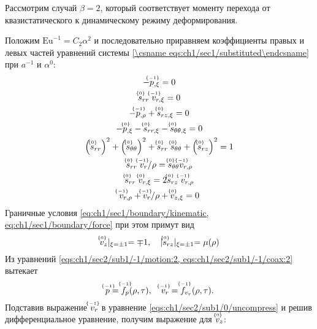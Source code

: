 Рассмотрим случай $\beta=2$, который соответствует моменту перехода от квазистатического к динамическому режиму деформирования.

Положим $\text{Eu}^{-1} = C_2 \alpha^2$ и последовательно приравняем коэффициенты правых и левых частей уравнений системы \cref{\csname eqs:ch1/sec1/substituted\endcsname} при $a^{-1}$ и $\alpha^0$:
\begingroup
\allowdisplaybreaks
\begin{gather}
  \label{eqs:ch1/sec2/sub1/-1/motion:2}
  -\uindex{p}{-1}_{,\xi} = 0
  \\
  \label{eqs:ch1/sec2/sub1/-1/coax:2}
  \uindex{s}{0}_{rr} \; \uindex{v}{-1}_{r,\xi} = 0
  \\
  \label{eqs:ch1/sec2/sub1/0/motion:1}
  -\uindex{p}{-1}_{,\rho}+\uindex{s}{0}_{rz,\xi} = 0
  \\
  \label{eqs:ch1/sec2/sub1/0/motion:2}
  -\uindex{p}{0}_{,\xi} - \uindex{s}{0}_{rr,\xi} - \uindex{s}{0}_{\theta\theta,\xi} = 0
  \\
  \label{eqs:ch1/sec2/sub1/0/plasticity}
  \left(\uindex{s}{0}_{rr}\right)^2 + \left(\uindex{s}{0}_{\theta\theta}\right)^2 + \uindex{s}{0}_{rr}\; \uindex{s}{0}_{\theta\theta} + \left(\uindex{s}{0}_{rz}\right)^2 = 1
  \\
  \label{eqs:ch1/sec2/sub1/0/coax:1}
  \uindex{s}{0}_{rr} \; \uindex{v}{-1}_{r} / \rho = \uindex{s}{0}_{\theta\theta} \uindex{v}{-1}_{r,\rho}
  \\
  \label{eqs:ch1/sec2/sub1/0/coax:2}
  \uindex{s}{0}_{rr} \; \uindex{v}{0}_{r,\xi} = 2 \uindex{s}{0}_{rz} \; \uindex{v}{-1}_{r,\rho}
  \\
  \label{eqs:ch1/sec2/sub1/0/uncompress}
  \uindex{v}{-1}_{r,\rho} + \uindex{v}{-1}_{r} / \rho + \uindex{v}{0}_{z,\xi} = 0
\end{gather}
\endgroup
Граничные условия \cref{eq:ch1/sec1/boundary/kinematic, eq:ch1/sec1/boundary/force} при этом примут вид
\begin{equation}
  \label{eq:ch1/sec1/sub1/boundary/0}
  \uindex{v}{0}_{z}\lvert_{\xi=\pm 1} = \mp 1, \quad \lvert \uindex{s}{0}_{rz}\lvert_{\xi=\pm 1} = \mu(\rho)
\end{equation}
Из уравнений \cref{eqs:ch1/sec2/sub1/-1/motion:2, eqs:ch1/sec2/sub1/-1/coax:2} вытекает
\begin{equation*}
  \uindex{p}{-1} = \uindex{f}{-1}_{p}(\rho, \tau), \quad \uindex{v}{-1}_{r} = \uindex{f}{-1}_{v_{r}}(\rho, \tau).
\end{equation*}
Подставив выражение $\uindex{v}{-1}_{r}$ в уравнение \cref{eqs:ch1/sec2/sub1/0/uncompress} и решив дифференциальное уравнение, получим выражение для $\uindex{v}{0}_{z}$:
